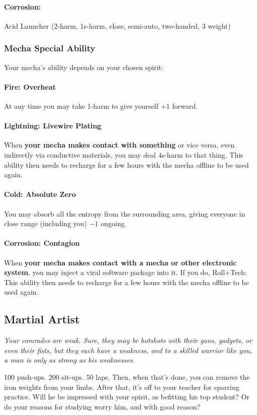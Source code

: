 \paragraph{Corrosion:} Acid Launcher (2-harm, 1s-harm, close, semi-auto, two-handed, 3 weight)

\subsubsection{Mecha Special Ability}
Your mecha's ability depends on your chosen spirit:

\paragraph{Fire: Overheat}
At any time you may take 1-harm to give yourself $+1$ forward.

\paragraph{Lightning: Livewire Plating}
When \textbf{your mecha makes contact with something} or vice versa,
even indirectly via conductive materials, you may deal 4s-harm to that
thing. This ability then needs to recharge for a few hours with the
mecha offline to be used again.


\paragraph{Cold: Absolute Zero}
You may absorb all the entropy from the surrounding area, giving
everyone in close range (including you) $-1$ ongoing.

\paragraph{Corrosion: Contagion} 
When \textbf{your mecha makes contact with a mecha or other electronic
  system}, you may inject a viral software package into it. If you do,
Roll+Tech:  This ability then needs to
recharge for a few hours with the mecha offline to be used again.



\subsection{Martial Artist}
{\itshape Your comrades are weak. Sure, they may be hotshots with
  their guns, gadgets, or even their fists, but they each have a
  weakness, and to a skilled warrior like you, a man is only as strong
  as his weaknesses.

100 push-ups. 200 sit-ups. 50 laps. Then, when that's done, you can
remove the iron weights from your limbs. After that, it's off to your
teacher for sparring practice. Will he be impressed with your spirit,
as befitting his top student? Or do your reasons for studying worry
him, and with good reason?}
